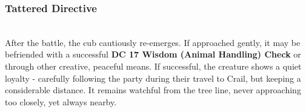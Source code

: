 \subsubsection*{Tattered Directive}\label{resource:TatteredDirective}
\hfill\\
{\entryfont\noindent After the battle, the cub cautiously re-emerges. If approached gently, it may be befriended with a successful \textbf{DC 17 Wisdom (Animal Handling) Check} or through other creative, peaceful means. If successful, the creature shows a quiet loyalty - carefully following the party during their travel to Crail, but keeping a considerable distance. It remains watchful from the tree line, never approaching too closely, yet always nearby.}

{\centering\contourlength{0.05em}\Large{}\\}